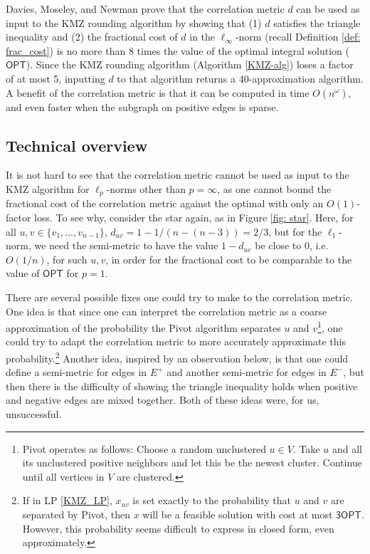 \documentclass[11pt]{article}
\begin{document}
Davies, Moseley, and Newman \citeyearpar{DMN23} prove that the correlation metric $d$ can be used as input to the KMZ rounding algorithm by showing that (1) $d$ satisfies the triangle inequality and (2) the fractional cost of $d$ in the $\ell_{\infty}$-norm (recall Definition \ref{def: frac_cost}) is no more than 8 times the value of the optimal integral solution ($\textsf{OPT}$). Since the KMZ rounding algorithm (Algorithm \ref{KMZ-alg}) loses a factor of at most 5, inputting $d$ to that algorithm returns a 40-approximation algorithm. 
A benefit of the correlation metric is that it can be computed in time $O(n^{\omega})$, and even faster when the subgraph on positive edges is sparse. 




\subsection{Technical overview}
 It is not hard to see that the correlation metric cannot be used as input to the KMZ algorithm for $\ell_p$-norms other than $p = \infty$, as one cannot bound the fractional cost of the correlation metric against the optimal with only an $O(1)$-factor loss. To see why, consider the star again, as in Figure \ref{fig: star}. Here, for all $u,v \in \{v_1,\ldots,v_{n-1}\}$, $d_{uv} = 1- 1/(n-(n-3)) = 2/3$, but for the $\ell_1$-norm, we need the semi-metric to have the value $1-d_{uv}$ be close to 0, i.e. $O(1/n)$, for such $u,v$, in order for the fractional cost to be comparable to the value of $\textsf{OPT}$ for $p=1$. 


There are several possible fixes one could try to make to the correlation metric. 
One idea is that since one can interpret the correlation metric as a coarse approximation of the probability the Pivot algorithm separates $u$ and $v$\footnote{Pivot operates as follows: Choose a random unclustered $u \in V$. Take $u$ and all its unclustered positive neighbors and let this be the newest cluster. Continue until all vertices in $V$ are clustered.}, 
one could try to adapt the correlation metric to more accurately approximate this probability.\footnote{If in LP \ref{KMZ_LP}, $x_{uv}$ is set exactly to the probability that $u$ and $v$ are separated by Pivot, then $x$ will be a feasible solution with cost at most $\textsf{3OPT}$. However, this probability seems difficult to express in closed form, even approximately.}
Another idea, inspired by an observation below, is that one could define a semi-metric for edges in $E^+$ and another semi-metric for edges in $E^-$, but then there is the difficulty of showing the triangle inequality holds when positive and negative edges are mixed together. 
Both of these ideas were, for us, unsuccessful.
\end{document}
